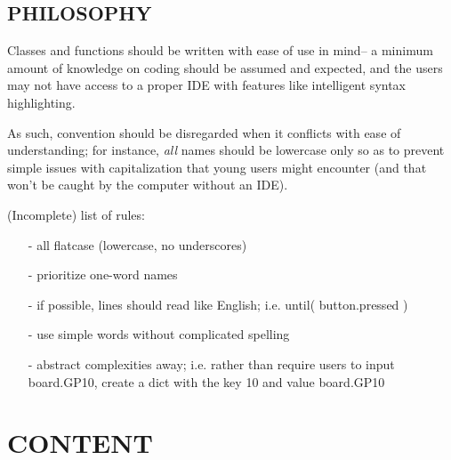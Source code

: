 \documentclass[12pt]{scrartcl} %
\begin{document}
\subsection{PHILOSOPHY}

Classes and functions should be written with ease of use in mind-- a minimum
amount of knowledge on coding should be assumed and expected, and the users may
not have access to a proper IDE with features like intelligent syntax
highlighting.

As such, convention should be disregarded when it conflicts with ease of
understanding; for instance, \emph{all} names should be lowercase only so as to
prevent simple issues with capitalization that young users might encounter (and
that won't be caught by the computer without an IDE).

(Incomplete) list of rules:

\begin{itemize}
  \item[-] all flatcase (lowercase, no underscores)
  \item[-] prioritize one-word names
  \item[-] if possible, lines should read like English; i.e. until( button.pressed )
  \item[-] use simple words without complicated spelling
  \item[-] abstract complexities away; i.e. rather than require users to input
    board.GP10, create a dict with the key 10 and value board.GP10
\end{itemize}

\newpage
\section{CONTENT}
\label{section:detailedDesignDescription}
\end{document}

